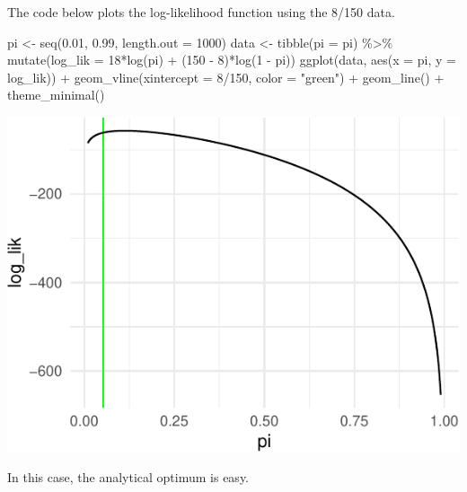 \documentclass[
]{book}
\newenvironment{Shaded}{\begin{snugshade}}{\end{snugshade}}
\newcommand{\AttributeTok}[1]{\textcolor[rgb]{0.77,0.63,0.00}{#1}}
\newcommand{\DecValTok}[1]{\textcolor[rgb]{0.00,0.00,0.81}{#1}}
\newcommand{\FloatTok}[1]{\textcolor[rgb]{0.00,0.00,0.81}{#1}}
\newcommand{\FunctionTok}[1]{\textcolor[rgb]{0.00,0.00,0.00}{#1}}
\newcommand{\NormalTok}[1]{#1}
\newcommand{\OtherTok}[1]{\textcolor[rgb]{0.56,0.35,0.01}{#1}}
\newcommand{\SpecialCharTok}[1]{\textcolor[rgb]{0.00,0.00,0.00}{#1}}
\newcommand{\StringTok}[1]{\textcolor[rgb]{0.31,0.60,0.02}{#1}}
\begin{document}
The code below plots the log-likelihood function using the 8/150 data.

\begin{Shaded}
\begin{Highlighting}[]
\NormalTok{pi }\OtherTok{\textless{}{-}} \FunctionTok{seq}\NormalTok{(}\FloatTok{0.01}\NormalTok{, }\FloatTok{0.99}\NormalTok{, }\AttributeTok{length.out =} \DecValTok{1000}\NormalTok{)}
\NormalTok{data }\OtherTok{\textless{}{-}} \FunctionTok{tibble}\NormalTok{(}\AttributeTok{pi =}\NormalTok{ pi) }\SpecialCharTok{\%\textgreater{}\%}
  \FunctionTok{mutate}\NormalTok{(}\AttributeTok{log\_lik =} \DecValTok{18}\SpecialCharTok{*}\FunctionTok{log}\NormalTok{(pi) }\SpecialCharTok{+}\NormalTok{ (}\DecValTok{150} \SpecialCharTok{{-}} \DecValTok{8}\NormalTok{)}\SpecialCharTok{*}\FunctionTok{log}\NormalTok{(}\DecValTok{1} \SpecialCharTok{{-}}\NormalTok{ pi))}
\FunctionTok{ggplot}\NormalTok{(data, }\FunctionTok{aes}\NormalTok{(}\AttributeTok{x =}\NormalTok{ pi, }\AttributeTok{y =}\NormalTok{ log\_lik)) }\SpecialCharTok{+} 
  \FunctionTok{geom\_vline}\NormalTok{(}\AttributeTok{xintercept =} \DecValTok{8}\SpecialCharTok{/}\DecValTok{150}\NormalTok{, }\AttributeTok{color =} \StringTok{"green"}\NormalTok{) }\SpecialCharTok{+} 
  \FunctionTok{geom\_line}\NormalTok{() }\SpecialCharTok{+} 
  \FunctionTok{theme\_minimal}\NormalTok{()}
\end{Highlighting}
\end{Shaded}

\includegraphics{01-01-maximum-likelihood_files/figure-latex/unnamed-chunk-2-1.pdf}

In this case, the analytical optimum is easy.
\end{document}
